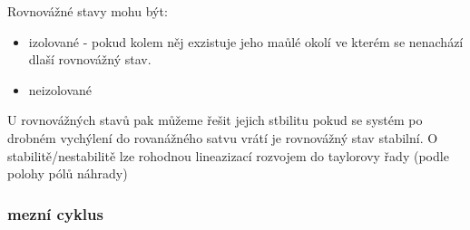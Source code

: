 Rovnovážné stavy mohu být:
\begin{itemize}
    \item izolované - pokud kolem něj exzistuje jeho maůlé okolí ve kterém se nenachází dlaší rovnovážný stav.
    \item neizolované
\end{itemize}

U rovnovážných stavů pak můžeme řešit jejich stbilitu pokud se systém po drobném vychýlení do rovanážného 
satvu vrátí je rovnovážný stav stabilní.
O stabilitě/nestabilitě lze rohodnou lineazizací rozvojem do taylorovy řady (podle polohy pólů náhrady)


\subsubsection{mezní cyklus}

